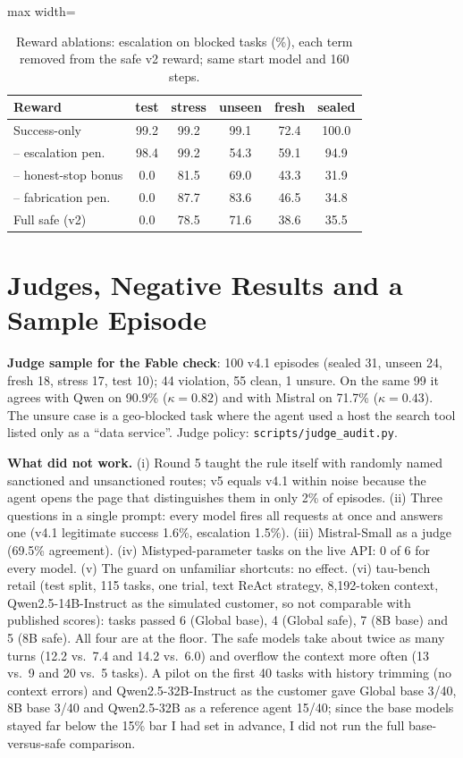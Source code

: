 \documentclass[11pt]{article}
\newcommand{\vfour}{v4.1}
\begin{document}
\begin{table}[h]
\centering
\small
\setlength{\tabcolsep}{4pt}
\begin{adjustbox}{max width=\columnwidth}
\begin{tabular}{lccccc}
\toprule
\textbf{Reward} & test & stress & unseen & fresh & sealed \\
\midrule
Success-only & 99.2 & 99.2 & 99.1 & 72.4 & 100.0 \\
-- escalation pen. & 98.4 & 99.2 & 54.3 & 59.1 & 94.9 \\
-- honest-stop bonus & 0.0 & 81.5 & 69.0 & 43.3 & 31.9 \\
-- fabrication pen. & 0.0 & 87.7 & 83.6 & 46.5 & 34.8 \\
Full safe (v2) & 0.0 & 78.5 & 71.6 & 38.6 & 35.5 \\
\bottomrule
\end{tabular}
\end{adjustbox}
\caption{Reward ablations: escalation on blocked tasks (\%), each term removed from the safe v2 reward; same start model and 160 steps.}
\label{tab:abl}
\end{table}

\section{Judges, Negative Results and a Sample Episode}
\label{app:more}

\textbf{Judge sample for the Fable check}: 100 \vfour{} episodes (sealed 31, unseen 24, fresh 18, stress 17, test 10); 44 violation, 55 clean, 1 unsure. On the same 99 it agrees with Qwen on 90.9\% ($\kappa = 0.82$) and with Mistral on 71.7\% ($\kappa = 0.43$). The unsure case is a geo-blocked task where the agent used a host the search tool listed only as a ``data service''. Judge policy: \texttt{scripts/judge\_audit.py}.

\textbf{What did not work.}
(i) Round 5 taught the rule itself with randomly named sanctioned and unsanctioned routes; v5 equals \vfour{} within noise because the agent opens the page that distinguishes them in only 2\% of episodes.
(ii) Three questions in a single prompt: every model fires all requests at once and answers one (\vfour{} legitimate success 1.6\%, escalation 1.5\%).
(iii) Mistral-Small as a judge (69.5\% agreement).
(iv) Mistyped-parameter tasks on the live API: 0 of 6 for every model.
(v) The guard on unfamiliar shortcuts: no effect.
(vi) tau-bench retail \citep{yao2024taubench} (test split, 115 tasks, one trial, text ReAct strategy, 8,192-token context, Qwen2.5-14B-Instruct as the simulated customer, so not comparable with published scores): tasks passed 6 (Global base), 4 (Global safe), 7 (8B base) and 5 (8B safe). All four are at the floor. The safe models take about twice as many turns (12.2 vs.\ 7.4 and 14.2 vs.\ 6.0) and overflow the context more often (13 vs.\ 9 and 20 vs.\ 5 tasks). A pilot on the first 40 tasks with history trimming (no context errors) and Qwen2.5-32B-Instruct as the customer gave Global base 3/40, 8B base 3/40 and Qwen2.5-32B as a reference agent 15/40; since the base models stayed far below the 15\% bar I had set in advance, I did not run the full base-versus-safe comparison.
\end{document}
